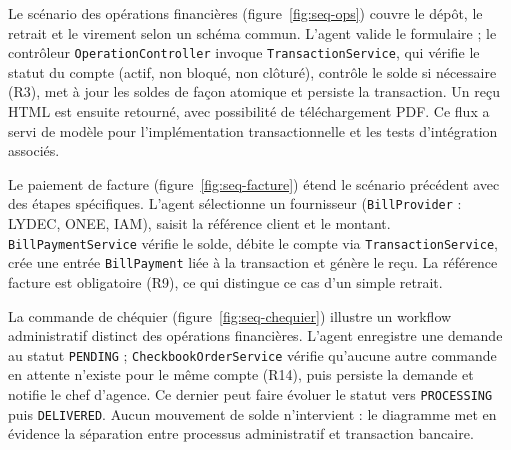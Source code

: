 \documentclass[11pt,a4paper,oneside]{report}
\begin{document}

Le scénario des opérations financières (figure~\ref{fig:seq-ops}) couvre le dépôt, le retrait et le virement selon un schéma commun. L'agent valide le formulaire ; le contrôleur \texttt{OperationController} invoque \texttt{TransactionService}, qui vérifie le statut du compte (actif, non bloqué, non clôturé), contrôle le solde si nécessaire (R3), met à jour les soldes de façon atomique et persiste la transaction. Un reçu HTML est ensuite retourné, avec possibilité de téléchargement PDF. Ce flux a servi de modèle pour l'implémentation transactionnelle et les tests d'intégration associés.


Le paiement de facture (figure~\ref{fig:seq-facture}) étend le scénario précédent avec des étapes spécifiques. L'agent sélectionne un fournisseur (\texttt{BillProvider} : LYDEC, ONEE, IAM), saisit la référence client et le montant. \texttt{BillPaymentService} vérifie le solde, débite le compte via \texttt{TransactionService}, crée une entrée \texttt{BillPayment} liée à la transaction et génère le reçu. La référence facture est obligatoire (R9), ce qui distingue ce cas d'un simple retrait.


La commande de chéquier (figure~\ref{fig:seq-chequier}) illustre un workflow administratif distinct des opérations financières. L'agent enregistre une demande au statut \texttt{PENDING} ; \texttt{CheckbookOrderService} vérifie qu'aucune autre commande en attente n'existe pour le même compte (R14), puis persiste la demande et notifie le chef d'agence. Ce dernier peut faire évoluer le statut vers \texttt{PROCESSING} puis \texttt{DELIVERED}. Aucun mouvement de solde n'intervient : le diagramme met en évidence la séparation entre processus administratif et transaction bancaire.
\end{document}
